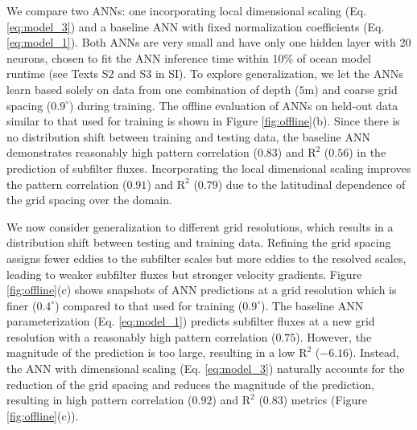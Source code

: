 \documentclass[draft]{agujournal2019}
\begin{document}
We compare two ANNs: one incorporating local dimensional scaling (Eq. \eqref{eq:model_3}) and a baseline ANN with fixed normalization coefficients (Eq. \eqref{eq:model_1}). Both ANNs are very small and have only one hidden layer with 20 neurons, chosen to fit the ANN inference time within 10\% of ocean model runtime (see Texts S2 and S3 in SI). To explore generalization, we let the ANNs learn based solely on data from one combination of depth ($5$m) and coarse grid spacing ($0.9^\circ$) during training. The offline evaluation of ANNs on held-out data similar to that used for training is shown in Figure \ref{fig:offline}(b). Since there is no distribution shift between training and testing data, the baseline ANN demonstrates reasonably high pattern correlation ($0.83$) and $\mathrm{R}^2$ ($0.56$) in the prediction of subfilter fluxes. Incorporating the local dimensional scaling improves the pattern correlation ($0.91$) and $\mathrm{R}^2$ ($0.79$) due to the latitudinal dependence of the grid spacing over the domain. 

We now consider generalization to different grid resolutions, which results in a distribution shift between testing and training data. %
Refining the grid spacing assigns fewer eddies to the subfilter scales but more eddies to the resolved scales, leading to weaker subfilter fluxes but stronger velocity gradients. Figure \ref{fig:offline}(c) shows snapshots of ANN predictions at a grid resolution which is finer ($0.4^\circ$) compared to that used for training ($0.9^\circ$). The baseline ANN parameterization (Eq. \eqref{eq:model_1}) predicts subfilter fluxes at a new grid resolution with a reasonably high pattern correlation ($0.75$). However, the magnitude of the prediction is too large, resulting in a low  $\mathrm{R}^2$ ($-6.16$).  %
Instead, the ANN with dimensional scaling (Eq. \eqref{eq:model_3}) naturally accounts for the reduction of the grid spacing and reduces the magnitude of the prediction, resulting in high pattern correlation ($0.92$) and $\mathrm{R}^2$ (0.83) metrics (Figure \ref{fig:offline}(c)).
\end{document}
